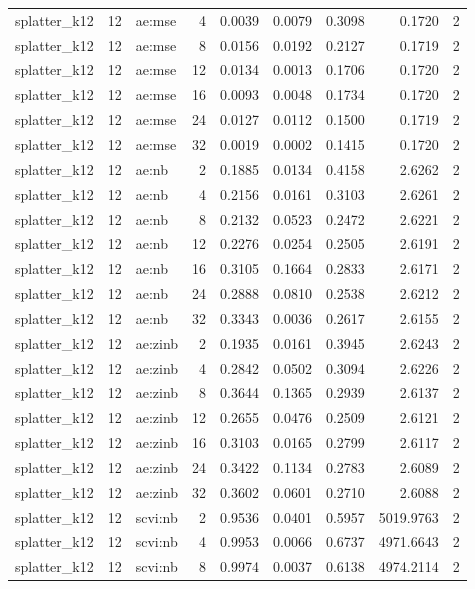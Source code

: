 \begin{tabular}{lrlrrrrrr}
splatter\_k12 & 12 & ae:mse & 4 & 0.0039 & 0.0079 & 0.3098 & 0.1720 & 2 \\
splatter\_k12 & 12 & ae:mse & 8 & 0.0156 & 0.0192 & 0.2127 & 0.1719 & 2 \\
splatter\_k12 & 12 & ae:mse & 12 & 0.0134 & 0.0013 & 0.1706 & 0.1720 & 2 \\
splatter\_k12 & 12 & ae:mse & 16 & 0.0093 & 0.0048 & 0.1734 & 0.1720 & 2 \\
splatter\_k12 & 12 & ae:mse & 24 & 0.0127 & 0.0112 & 0.1500 & 0.1719 & 2 \\
splatter\_k12 & 12 & ae:mse & 32 & 0.0019 & 0.0002 & 0.1415 & 0.1720 & 2 \\
splatter\_k12 & 12 & ae:nb & 2 & 0.1885 & 0.0134 & 0.4158 & 2.6262 & 2 \\
splatter\_k12 & 12 & ae:nb & 4 & 0.2156 & 0.0161 & 0.3103 & 2.6261 & 2 \\
splatter\_k12 & 12 & ae:nb & 8 & 0.2132 & 0.0523 & 0.2472 & 2.6221 & 2 \\
splatter\_k12 & 12 & ae:nb & 12 & 0.2276 & 0.0254 & 0.2505 & 2.6191 & 2 \\
splatter\_k12 & 12 & ae:nb & 16 & 0.3105 & 0.1664 & 0.2833 & 2.6171 & 2 \\
splatter\_k12 & 12 & ae:nb & 24 & 0.2888 & 0.0810 & 0.2538 & 2.6212 & 2 \\
splatter\_k12 & 12 & ae:nb & 32 & 0.3343 & 0.0036 & 0.2617 & 2.6155 & 2 \\
splatter\_k12 & 12 & ae:zinb & 2 & 0.1935 & 0.0161 & 0.3945 & 2.6243 & 2 \\
splatter\_k12 & 12 & ae:zinb & 4 & 0.2842 & 0.0502 & 0.3094 & 2.6226 & 2 \\
splatter\_k12 & 12 & ae:zinb & 8 & 0.3644 & 0.1365 & 0.2939 & 2.6137 & 2 \\
splatter\_k12 & 12 & ae:zinb & 12 & 0.2655 & 0.0476 & 0.2509 & 2.6121 & 2 \\
splatter\_k12 & 12 & ae:zinb & 16 & 0.3103 & 0.0165 & 0.2799 & 2.6117 & 2 \\
splatter\_k12 & 12 & ae:zinb & 24 & 0.3422 & 0.1134 & 0.2783 & 2.6089 & 2 \\
splatter\_k12 & 12 & ae:zinb & 32 & 0.3602 & 0.0601 & 0.2710 & 2.6088 & 2 \\
splatter\_k12 & 12 & scvi:nb & 2 & 0.9536 & 0.0401 & 0.5957 & 5019.9763 & 2 \\
splatter\_k12 & 12 & scvi:nb & 4 & 0.9953 & 0.0066 & 0.6737 & 4971.6643 & 2 \\
splatter\_k12 & 12 & scvi:nb & 8 & 0.9974 & 0.0037 & 0.6138 & 4974.2114 & 2 \\

\end{tabular}
